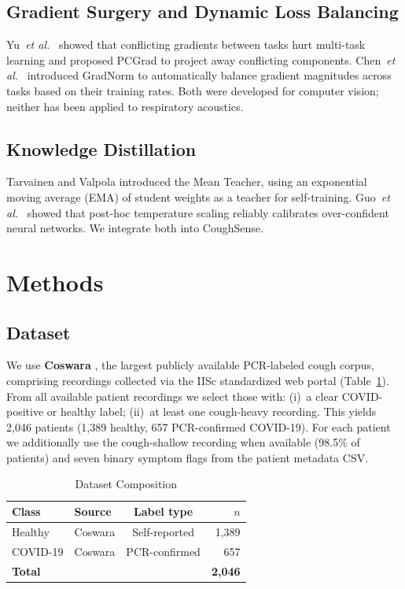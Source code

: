 \documentclass[journal]{IEEEtran}
\begin{document}
\subsection{Gradient Surgery and Dynamic Loss Balancing}

Yu~\textit{et al.}\ \cite{pcgrad} showed that conflicting gradients
between tasks hurt multi-task learning and proposed PCGrad to project
away conflicting components. Chen~\textit{et al.}\ \cite{gradnorm}
introduced GradNorm to automatically balance gradient magnitudes across
tasks based on their training rates. Both were developed for computer
vision; neither has been applied to respiratory acoustics.

\subsection{Knowledge Distillation}

Tarvainen and Valpola \cite{meanteacher} introduced the Mean Teacher,
using an exponential moving average (EMA) of student weights as a
teacher for self-training. Guo~\textit{et al.}\ \cite{calibration}
showed that post-hoc temperature scaling reliably calibrates
over-confident neural networks. We integrate both into CoughSense.

\section{Methods}
\label{sec:methods}

\subsection{Dataset}
\label{sec:data}

We use \textbf{Coswara} \cite{coswara}, the largest publicly available
PCR-labeled cough corpus, comprising recordings collected via the IISc
standardized web portal (Table~\ref{tab:dataset}). From all available
patient recordings we select those with: (i)~a clear COVID-positive or
healthy label; (ii)~at least one cough-heavy recording. This yields
2,046 patients (1,389 healthy, 657 PCR-confirmed COVID-19). For
each patient we additionally use the cough-shallow recording when
available (98.5\% of patients) and seven binary symptom flags from the
patient metadata CSV.

\begin{table}[!t]
\renewcommand{\arraystretch}{1.3}
\caption{Dataset Composition}
\label{tab:dataset}
\centering
\begin{tabular}{llcr}
\toprule
\textbf{Class} & \textbf{Source} & \textbf{Label type} & \textbf{$n$} \\
\midrule
Healthy    & Coswara  & Self-reported  & 1,389 \\
COVID-19   & Coswara  & PCR-confirmed  & 657   \\
\midrule
\textbf{Total} & & & \textbf{2,046} \\
\bottomrule
\end{tabular}
\end{table}
\end{document}

